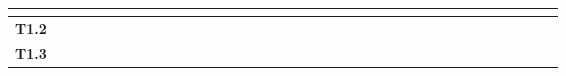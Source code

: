 \begin{table}[h]
{\begin{tabular}{|l|llllllllllll|llllllllllll|llllllllllll|}
  \multicolumn{1}{l|}{} &
  \multicolumn{1}{l|}{} &
  \multicolumn{1}{l|}{} &
  \multicolumn{1}{l|}{} &
  \multicolumn{1}{l|}{} &
  \multicolumn{1}{l|}{} &
  \multicolumn{1}{l|}{} &
  \multicolumn{1}{l|}{} &
  \multicolumn{1}{l|}{} &
  \multicolumn{1}{l|}{} &
  \multicolumn{1}{l|}{} &
   \\ \hline
\textbf{T1.2} &
  \multicolumn{1}{l|}{} &
  \multicolumn{1}{l|}{} &
  \multicolumn{1}{l|}{} &
  \multicolumn{1}{l|}{} &
  \multicolumn{1}{l|}{} &
  \multicolumn{1}{l|}{} &
  \multicolumn{1}{l|}{\cellcolor[HTML]{FBD4B4}} &
  \multicolumn{1}{l|}{\cellcolor[HTML]{FBD4B4}} &
  \multicolumn{1}{l|}{\cellcolor[HTML]{FBD4B4}} &
  \multicolumn{1}{l|}{\cellcolor[HTML]{FBD4B4}} &
  \multicolumn{1}{l|}{\cellcolor[HTML]{FBD4B4}} &
  \multicolumn{1}{l|}{\cellcolor[HTML]{FBD4B4}} &
  \multicolumn{1}{l|}{\cellcolor[HTML]{FBD4B4}} &
  \multicolumn{1}{l|}{\cellcolor[HTML]{FBD4B4}} &
  \multicolumn{1}{l|}{\cellcolor[HTML]{FBD4B4}} &
  \multicolumn{1}{l|}{\cellcolor[HTML]{FBD4B4}} &
  \multicolumn{1}{l|}{\cellcolor[HTML]{FBD4B4}} &
  \multicolumn{1}{l|}{\cellcolor[HTML]{FBD4B4}} &
  \multicolumn{1}{l|}{} &
  \multicolumn{1}{l|}{} &
  \multicolumn{1}{l|}{} &
  \multicolumn{1}{l|}{} &
  \multicolumn{1}{l|}{} &
  \multicolumn{1}{l|}{} &
  \multicolumn{1}{l|}{} &
  \multicolumn{1}{l|}{} &
  \multicolumn{1}{l|}{} &
  \multicolumn{1}{l|}{} &
  \multicolumn{1}{l|}{} &
  \multicolumn{1}{l|}{} &
  \multicolumn{1}{l|}{} &
  \multicolumn{1}{l|}{} &
  \multicolumn{1}{l|}{} &
  \multicolumn{1}{l|}{} &
  \multicolumn{1}{l|}{} &
  \multicolumn{1}{l|}{} 
   \\ \hline
\textbf{T1.3} &
  \multicolumn{1}{l|}{} &
  \multicolumn{1}{l|}{} &
  \multicolumn{1}{l|}{} &
  \multicolumn{1}{l|}{} &
  \multicolumn{1}{l|}{} &
  \multicolumn{1}{l|}{} &
  \multicolumn{1}{l|}{} &
  \multicolumn{1}{l|}{} &
  \multicolumn{1}{l|}{} &
  \multicolumn{1}{l|}{} &
  \multicolumn{1}{l|}{} &
  \multicolumn{1}{l|}{} &
  \multicolumn{1}{l|}{\cellcolor[HTML]{FBD4B4}} &
  \multicolumn{1}{l|}{\cellcolor[HTML]{FBD4B4}} &
  \multicolumn{1}{l|}{\cellcolor[HTML]{FBD4B4}} &
  \multicolumn{1}{l|}{\cellcolor[HTML]{FBD4B4}} &
  \multicolumn{1}{l|}{\cellcolor[HTML]{FBD4B4}} &
  \multicolumn{1}{l|}{\cellcolor[HTML]{FBD4B4}} &
  \multicolumn{1}{l|}{\cellcolor[HTML]{FBD4B4}} &
  \multicolumn{1}{l|}{\cellcolor[HTML]{FBD4B4}} &
  \multicolumn{1}{l|}{\cellcolor[HTML]{FBD4B4}} &
  \multicolumn{1}{l|}{\cellcolor[HTML]{FBD4B4}} &
  \multicolumn{1}{l|}{\cellcolor[HTML]{FBD4B4}} &
  \multicolumn{1}{l|}{\cellcolor[HTML]{FBD4B4}} &
  \multicolumn{1}{l|}{\cellcolor[HTML]{FBD4B4}} &

\end{tabular}}
\end{table}

